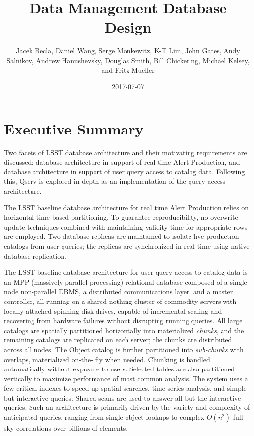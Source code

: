 \documentclass[DM,toc]{lsstdoc}
\title{Data Management Database Design}
\author{%
	Jacek Becla,
	Daniel Wang,
	Serge Monkewitz,
	K-T Lim,
	John Gates,
	Andy Salnikov,
	Andrew Hanushevsky,
	Douglas Smith,
	Bill Chickering,
	Michael Kelsey,
	and
	Fritz Mueller
}
\date{2017-07-07}
\begin{document}
\maketitle

\section{Executive Summary}\label{executive-summary}

Two facets of LSST database architecture and their motivating requirements
are discussed: database architecture in support of real time Alert Production,
and database architecture in support of user query access to catalog data.
Following this, Qserv is explored in depth as an implementation of the query
access architecture.

The LSST baseline database architecture for real time Alert
Production relies on horizontal time-based partitioning. To guarantee
reproducibility, no-overwrite-update techniques combined with
maintaining validity time for appropriate rows are employed. Two
database replicas are maintained to isolate live production catalogs
from user queries; the replicas are synchronized in real time using
native database replication.

The LSST baseline database architecture for user query access to catalog data
is an MPP (massively parallel processing) relational database composed of a
single-node non-parallel DBMS, a distributed communications layer, and a
master controller, all running on a shared-nothing cluster of commodity
servers with locally attached spinning disk drives, capable of incremental
scaling and recovering from hardware failures without disrupting running
queries. All large catalogs are spatially partitioned horizontally into
materialized \emph{chunks}, and the remaining catalogs are replicated on each
server; the chunks are distributed across all nodes. The Object catalog is
further partitioned into \emph{sub-chunks} with overlaps, materialized on-the-
fly when needed. Chunking is handled automatically without exposure to users.
Selected tables are also partitioned vertically to maximize performance of
most common analysis. The system uses a few critical indexes to speed up
spatial searches, time series analysis, and simple but interactive queries.
Shared scans are used to answer all but the interactive queries. Such an
architecture is primarily driven by the variety and complexity of anticipated
queries, ranging from single object lookups to complex \(O(n^2)\) full-sky
correlations over billions of elements.
\end{document}
